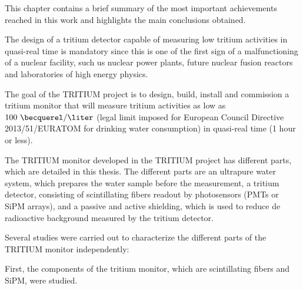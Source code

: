 This chapter contains a brief summary of the most important achievements reached in this work and highlights the main conclusions obtained.

The design of a tritium detector capable of measuring low tritium activities in quasi-real time is mandatory since this is one of the first sign of a malfunctioning of a nuclear facility, such us nuclear power plants, future nuclear fusion reactors and laboratories of high energy physics.

The goal of the TRITIUM project is to design, build, install and commission a tritium monitor that will measure tritium activities as low as $100~\becquerel/\liter$ (legal limit imposed for European Council Directive 2013/51/EURATOM for drinking water consumption) in quasi-real time (1 hour or less).

The TRITIUM monitor developed in the TRITIUM project has different parts, which are detailed in this thesis. The different parts are an ultrapure water system, which prepares the water sample before the measurement, a tritium detector, consisting of scintillating fibers readout by photosensors (PMTs or SiPM arrays), and a passive and active shielding, which is used to reduce de radioactive background measured by the tritium detector.

Several studies were carried out to characterize the different parts of the TRITIUM monitor independently:

First, the components of the tritium monitor, which are scintillating fibers and SiPM, were studied.

